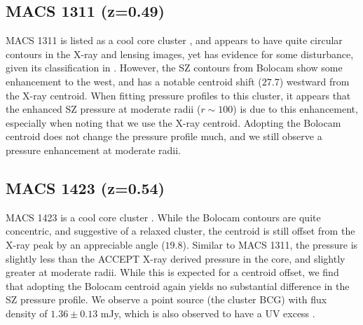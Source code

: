 \documentclass[iop,numberedappendix,apj]{emulateapj}
\begin{document}
\subsection{MACS 1311 (z=0.49)}
\label{sec:results_m1311}



MACS 1311 is listed as a cool core cluster \citep[e.g.][]{sayers2013}, and appears to have quite circular
contours in the X-ray and lensing images, yet has evidence for some disturbance, given its classification
in \citet{mann2012}. However, the SZ contours from Bolocam show some enhancement  to the west, and has
a notable centroid shift ($27.7$\asec) westward from the X-ray centroid. When fitting pressure profiles
to this cluster, it appears that the enhanced SZ pressure at moderate radii ($r \sim 100$\asec) is due
to this enhancement, especially when noting that we use the X-ray centroid. Adopting the Bolocam centroid
does not change the pressure profile much, and we still observe a pressure enhancement at moderate radii.



\subsection{MACS 1423 (z=0.54)}
\label{sec:results_m1423}


MACS 1423 is a cool core cluster \citep{mann2012,sayers2013}. While the Bolocam contours are quite concentric,
and suggestive of a relaxed cluster, the centroid is still offset from the X-ray peak by an appreciable angle 
($19.8$\asec). Similar to MACS 1311, the pressure is slightly less than the ACCEPT X-ray derived pressure in the
core, and slightly greater at moderate radii. While this is expected for a centroid offset, we find that adopting
the Bolocam centroid again yields no substantial difference in the SZ pressure profile. We observe a point source 
(the cluster BCG) with flux density of $1.36 \pm 0.13$ mJy, which is also observed to have a UV excess 
\citep{donahue2015}. 
\end{document}
